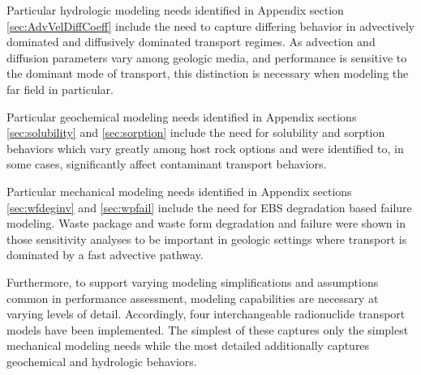Particular hydrologic modeling needs identified in Appendix section 
\ref{sec:AdvVelDiffCoeff} include the need to capture 
differing behavior in advectively dominated and diffusively dominated transport 
regimes. As advection and diffusion parameters vary among geologic media, and 
performance is sensitive to the dominant mode of transport, this distinction is 
necessary when modeling the far field in particular.

Particular geochemical modeling needs identified in Appendix sections 
\ref{sec:solubility} and \ref{sec:sorption} include the need for solubility and 
sorption behaviors which vary greatly among host rock options and were 
identified to, in some cases, significantly affect contaminant transport 
behaviors. 

Particular mechanical modeling needs identified in Appendix sections 
\ref{sec:wfdeginv} and \ref{sec:wpfail} include the need for \gls{EBS} 
degradation based failure modeling. Waste package and waste form degradation 
and failure were shown in those sensitivity analyses to be important in 
geologic settings where transport is dominated by a fast advective pathway. 

Furthermore, to support varying modeling simplifications and assumptions common 
in performance assessment, modeling capabilities are necessary at varying 
levels of detail.  Accordingly, four interchangeable radionuclide transport 
models have been implemented. The simplest of these captures only the simplest 
mechanical modeling needs while the most detailed additionally captures 
geochemical and hydrologic behaviors.

